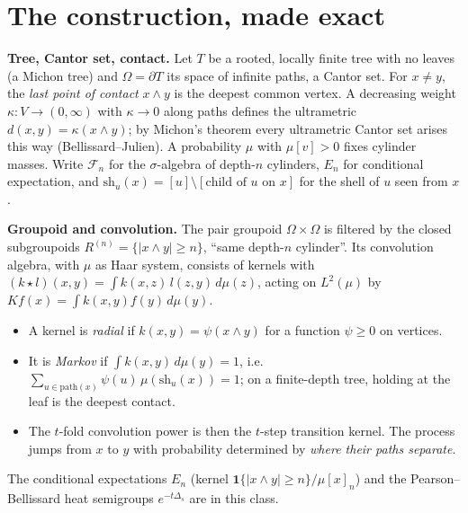 \documentclass[11pt]{article}
\theoremstyle{definition}
\theoremstyle{remark}
\begin{document}
\begin{abstract}
\textbf{(5) The verdict for random ReLU networks.} Gaussian inputs admit exact fair Cantor codings along any orthonormal frame, so all of this is implementable. Measured at width $256$, stratification gains are:
\begin{itemize}
\item random frames: $\approx1.00\times$;
\item a frame from the weights alone (the linearized network): $1.30\times$, $1.06\times$, 1.02$\times$ at depths $4,8,16$;
\item pilot-estimated Stein/Hessian frames: $1.51\times$, $1.33\times$, 1.15$\times$.
\end{itemize}
The mechanism is real but its payoff is small, because a deep random network's variance does not live at coarse levels of any cheap hierarchy. In the mean-field limit it sits at Hermite degree $\sim L^2$, by note~IV's critical Galton--Watson law.
\end{abstract}

\section{The construction, made exact}

\textbf{Tree, Cantor set, contact.} Let $T$ be a rooted, locally finite tree with no leaves (a Michon tree) and $\Omega=\partial T$ its space of infinite paths, a Cantor set. For $x\ne y$, the \emph{last point of contact} $x\wedge y$ is the deepest common vertex. A decreasing weight $\kappa:V\to(0,\infty)$ with $\kappa\to0$ along paths defines the ultrametric $d(x,y)=\kappa(x\wedge y)$; by Michon's theorem every ultrametric Cantor set arises this way (Bellissard--Julien). A probability $\mu$ with $\mu[v]>0$ fixes cylinder masses. Write $\mathcal F_n$ for the $\sigma$-algebra of depth-$n$ cylinders, $E_n$ for conditional expectation, and $\mathrm{sh}_u(x)=[u]\setminus[\text{child of }u\text{ on }x]$ for the shell of $u$ seen from $x$.

\textbf{Groupoid and convolution.} The pair groupoid $\Omega\times\Omega$ is filtered by the closed subgroupoids $R^{(n)}=\{|x\wedge y|\ge n\}$, ``same depth-$n$ cylinder''. Its convolution algebra, with $\mu$ as Haar system, consists of kernels with $(k\star l)(x,y)=\int k(x,z)\,l(z,y)\,d\mu(z)$, acting on $L^2(\mu)$ by $Kf(x)=\int k(x,y)f(y)\,d\mu(y)$.
\begin{itemize}
\item A kernel is \emph{radial} if $k(x,y)=\psi(x\wedge y)$ for a function $\psi\ge0$ on vertices.
\item It is \emph{Markov} if $\int k(x,y)\,d\mu(y)=1$, i.e.\ $\sum_{u\in\text{path}(x)}\psi(u)\,\mu(\mathrm{sh}_u(x))=1$; on a finite-depth tree, holding at the leaf is the deepest contact.
\item The $t$-fold convolution power is then the $t$-step transition kernel. The process jumps from $x$ to $y$ with probability determined by \emph{where their paths separate}.
\end{itemize}
The conditional expectations $E_n$ (kernel $\mathbf 1\{|x\wedge y|\ge n\}/\mu[x]_n$) and the Pearson--Bellissard heat semigroups $e^{-t\Delta_s}$ are in this class.
\end{document}

